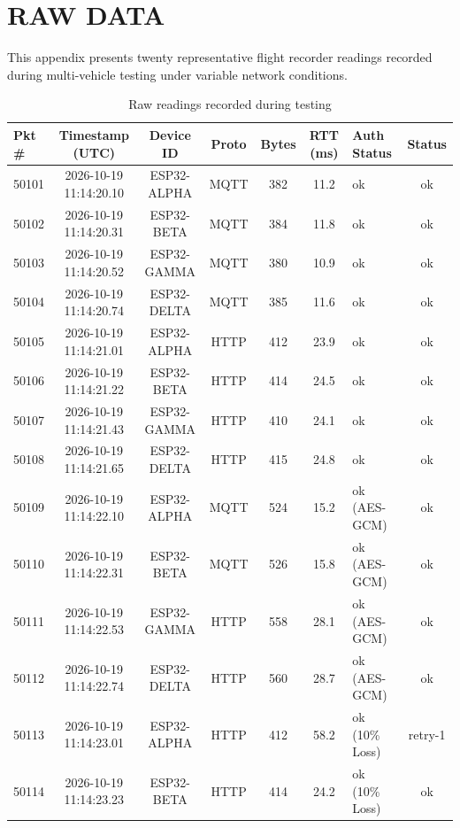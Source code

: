 \documentclass[12pt,a4paper]{report}
\begin{document}
\chapter{RAW DATA}
\label{app:raw_data}

This appendix presents twenty representative flight recorder readings recorded during multi-vehicle testing under variable network conditions.

\begin{table}[H]
\centering
\caption{Raw readings recorded during testing}
\label{tab:raw_data}
\scriptsize
\begin{tabularx}{\textwidth}{l c c c c c >{\raggedright\arraybackslash}X c}
\toprule
\textbf{Pkt \#} & \textbf{Timestamp (UTC)} & \textbf{Device ID} & \textbf{Proto} & \textbf{Bytes} & \textbf{RTT (ms)} & \textbf{Auth Status} & \textbf{Status} \\
\midrule
50101 & 2026-10-19 11:14:20.10 & ESP32-ALPHA & MQTT & 382 & 11.2 & ok & ok \\
50102 & 2026-10-19 11:14:20.31 & ESP32-BETA  & MQTT & 384 & 11.8 & ok & ok \\
50103 & 2026-10-19 11:14:20.52 & ESP32-GAMMA & MQTT & 380 & 10.9 & ok & ok \\
50104 & 2026-10-19 11:14:20.74 & ESP32-DELTA & MQTT & 385 & 11.6 & ok & ok \\
50105 & 2026-10-19 11:14:21.01 & ESP32-ALPHA & HTTP & 412 & 23.9 & ok & ok \\
50106 & 2026-10-19 11:14:21.22 & ESP32-BETA  & HTTP & 414 & 24.5 & ok & ok \\
50107 & 2026-10-19 11:14:21.43 & ESP32-GAMMA & HTTP & 410 & 24.1 & ok & ok \\
50108 & 2026-10-19 11:14:21.65 & ESP32-DELTA & HTTP & 415 & 24.8 & ok & ok \\
50109 & 2026-10-19 11:14:22.10 & ESP32-ALPHA & MQTT & 524 & 15.2 & ok (AES-GCM) & ok \\
50110 & 2026-10-19 11:14:22.31 & ESP32-BETA  & MQTT & 526 & 15.8 & ok (AES-GCM) & ok \\
50111 & 2026-10-19 11:14:22.53 & ESP32-GAMMA & HTTP & 558 & 28.1 & ok (AES-GCM) & ok \\
50112 & 2026-10-19 11:14:22.74 & ESP32-DELTA & HTTP & 560 & 28.7 & ok (AES-GCM) & ok \\
50113 & 2026-10-19 11:14:23.01 & ESP32-ALPHA & HTTP & 412 & 58.2 & ok (10\% Loss) & retry-1 \\
50114 & 2026-10-19 11:14:23.23 & ESP32-BETA  & HTTP & 414 & 24.2 & ok (10\% Loss) & ok \\

\end{tabularx}
\end{table}
\end{document}
